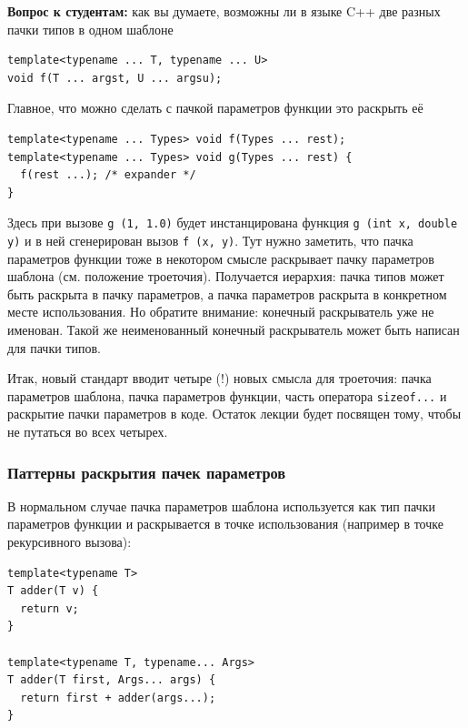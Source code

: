 \documentclass[a4paper,12pt,oneside]{article}
\newif\ifanswers
\begin{document}
\textbf{Вопрос к студентам:} как вы думаете, возможны ли в языке C++ две разных пачки типов в одном шаблоне

\begin{lstlisting}
template<typename ... T, typename ... U>
void f(T ... argst, U ... argsu);
\end{lstlisting}

\ifanswers
Правильный ответ: нет, это ошибка, их нельзя различить во время исполнения.
\fi

Главное, что можно сделать с пачкой параметров функции это раскрыть её

\begin{lstlisting}
template<typename ... Types> void f(Types ... rest);
template<typename ... Types> void g(Types ... rest) {
  f(rest ...); /* expander */
}
\end{lstlisting}

Здесь при вызове \lstinline!g (1, 1.0)! будет инстанцирована функция \lstinline!g (int x, double y)! и в ней сгенерирован вызов \lstinline!f (x, y)!. Тут нужно заметить, что пачка параметров функции тоже в некотором смысле раскрывает пачку параметров шаблона (см. положение троеточия). Получается иерархия: пачка типов может быть раскрыта в пачку параметров, а пачка параметров раскрыта в конкретном месте использования. Но обратите внимание: конечный раскрыватель уже не именован. Такой же неименованный конечный раскрыватель может быть написан для пачки типов.

Итак, новый стандарт вводит четыре (!) новых смысла для троеточия: пачка параметров шаблона, пачка параметров функции, часть оператора \lstinline!sizeof...! и раскрытие пачки параметров в коде. Остаток лекции будет посвящен тому, чтобы не путаться во всех четырех.

\subsubsection{Паттерны раскрытия пачек параметров}

В нормальном случае пачка параметров шаблона используется как тип пачки параметров функции и раскрывается в точке использования (например в точке рекурсивного вызова):

\begin{lstlisting}
template<typename T>
T adder(T v) {
  return v;
}

template<typename T, typename... Args>
T adder(T first, Args... args) {
  return first + adder(args...);
}
\end{lstlisting}
\end{document}

